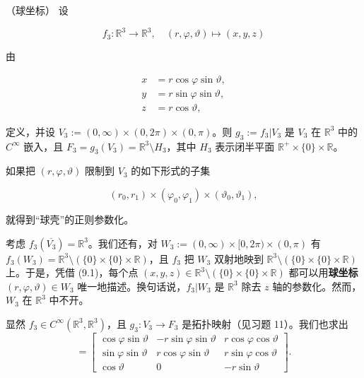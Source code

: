\begin{example}

\begin{items}
\item

（球坐标）
设

\[
f_{3} : \mathbb{R}^{3} \to \mathbb{R}^{3} , \quad (r, \varphi, \vartheta) \mapsto (x, y, z)
\]

由

\begin{equation}
\begin{aligned}
x &= r\cos\varphi\sin\vartheta , \\ y &= r\sin\varphi\sin\vartheta , \\ z &= r\cos\vartheta ,
\end{aligned}\tag{9.1}
\end{equation}

定义，并设 $ V_{3} := (0, \infty) \times (0, 2\pi) \times (0, \pi) $。则 $ g_{3} := f_{3}|V_{3} $ 是 $ V_{3} $ 在 $ \mathbb{R}^{3} $ 中的 $ C^{\infty} $ 嵌入，且 $ F_{3} = g_{3}(V_{3}) = \mathbb{R}^{3} \setminus H_{3} $，其中 $ H_{3} $ 表示闭半平面 $ \mathbb{R}^{+} \times \{0\} \times \mathbb{R} $。

\end{items}


如果把 $ (r, \varphi, \vartheta) $ 限制到 $ V_{3} $ 的如下形式的子集

\[
(r_{0}, r_{1}) \times (\varphi_{0}, \varphi_{1}) \times (\vartheta_{0}, \vartheta_{1}) ,
\]

就得到“球壳”的正则参数化。


考虑 $ f_{3}(\overline{V_{3}}) = \mathbb{R}^{3} $。我们还有，对 $ W_{3} := (0, \infty) \times [0, 2\pi) \times (0, \pi) $ 有 $ f_{3}(W_{3}) = \mathbb{R}^{3} \setminus (\{0\} \times \{0\} \times \mathbb{R}) $，且 $ f_{3} $ 把 $ W_{3} $ 双射地映到 $ \mathbb{R}^{3} \setminus (\{0\} \times \{0\} \times \mathbb{R}) $ 上。于是，凭借 (9.1)，每个点 $ (x, y, z) \in \mathbb{R}^{3} \setminus (\{0\} \times \{0\} \times \mathbb{R}) $ 都可以用\textbf{球坐标} $ (r, \varphi, \vartheta) \in W_{3} $ 唯一地描述。换句话说，$ f_{3}|W_{3} $ 是 $ \mathbb{R}^{3} $ 除去 $ z $ 轴的参数化。然而，$ W_{3} $ 在 $ \mathbb{R}^{3} $ 中不开。

\proofhead
显然 $ f_{3} \in C^{\infty}(\mathbb{R}^{3}, \mathbb{R}^{3}) $，且 $ g_{3} : V_{3} \to F_{3} $ 是拓扑映射（见习题 11）。我们也求出
\begin{equation*}
[\partial f_{3}(r, \varphi, \vartheta)] = \begin{bmatrix} \cos\varphi\sin\vartheta & -r\sin\varphi\sin\vartheta & r\cos\varphi\cos\vartheta \\ \sin\varphi\sin\vartheta & r\cos\varphi\sin\vartheta & r\sin\varphi\cos\vartheta \\ \cos\vartheta & 0 & -r\sin\vartheta \end{bmatrix} .
\end{equation*}


\end{example}
